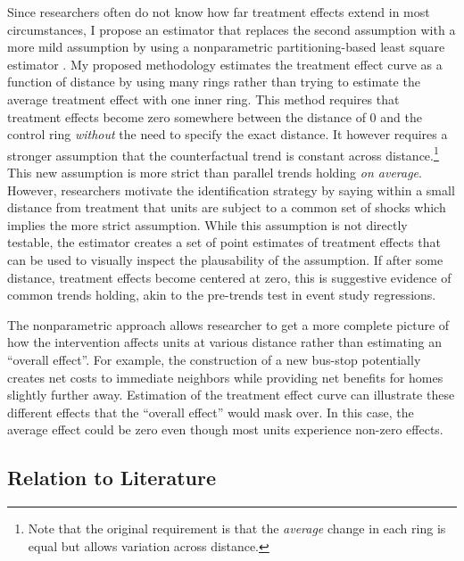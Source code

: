 \documentclass[10pt]{article}
\begin{document}
Since researchers often do not know how far treatment effects extend in most circumstances, I propose an estimator that replaces the second assumption with a more mild assumption by using a nonparametric partitioning-based least square estimator \citep{Cattaneo_Crump_Farrell_Feng_2019,Cattaneo_Farrell_Feng_2019}. My proposed methodology estimates the treatment effect curve as a function of distance by using many rings rather than trying to estimate the average treatment effect with one inner ring. This method requires that treatment effects become zero somewhere between the distance of 0 and the control ring \emph{without} the need to specify the exact distance. It however requires a stronger assumption that the counterfactual trend is constant across distance.\footnote{Note that the original requirement is that the \emph{average} change in each ring is equal but allows variation across distance.} This new assumption is more strict than parallel trends holding \emph{on average}. However, researchers motivate the identification strategy by saying within a small distance from treatment that units are subject to a common set of shocks which implies the more strict assumption. While this assumption is not directly testable, the estimator creates a set of point estimates of treatment effects that can be used to visually inspect the plausability of the assumption. If after some distance, treatment effects become centered at zero, this is suggestive evidence of common trends holding, akin to the pre-trends test in event study regressions.

The nonparametric approach allows researcher to get a more complete picture of how the intervention affects units at various distance rather than estimating an ``overall effect''. For example, the construction of a new bus-stop potentially creates net costs to immediate neighbors while providing net benefits for homes slightly further away. Estimation of the treatment effect curve can illustrate these different effects that the ``overall effect'' would mask over. In this case, the average effect could be zero even though most units experience non-zero effects.

\subsection{Relation to Literature}
\end{document}
